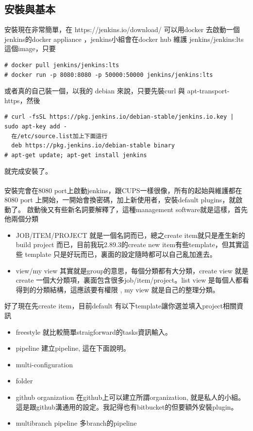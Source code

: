   \subsection{安裝與基本}
  安裝現在非常簡單，在 https://jenkins.io/download/
  可以用docker 去啟動一個jenkins的docker appliance ，jenkins小組會在docker hub 
  維護 jenkins/jenkins:lts 這個image，只要
  \begin{verbatim}
# docker pull jenkins/jenkins:lts
# docker run -p 8080:8080 -p 50000:50000 jenkins/jenkins:lts
  \end{verbatim}
  或者真的自己裝一個，以我的 debian 來說，只要先裝curl 與 apt-transport-https，然後
  \begin{verbatim}
# curl -fsSL https://pkg.jenkins.io/debian-stable/jenkins.io.key | sudo apt-key add -
  在/etc/source.list加上下面這行
  deb https://pkg.jenkins.io/debian-stable binary
# apt-get update; apt-get install jenkins
  \end{verbatim}
  就完成安裝了。
  \\\\
  安裝完會在8080 port上啟動jenkins，跟CUPS一樣很像，所有的起始與維護都在8080 port
  上開始，一開始會換密碼，加上新使用者，安裝default plugins，就啟動了。
  啟動後又有些新名詞要解釋了，這種management software就是這樣，首先他兩個分類
  \begin{itemize}
    \item JOB/ITEM/PROJECT 就是一個名詞而已，總之create item就只是產生新的build
      project 而已，目前我玩2.89.3的create new item有些template，但其實這些
      template 只是好玩而已，裏面的設定隨時都可以自己亂加進去。
    \item view/my view 其實就是group的意思，每個分類都有大分類，create view 就是
      create 一個大分類項，裏面包含很多job/item/project。list view 是每個人都看
      得到的分類結構，這應該要有權限 , my view 就是自己的整理分類。
  \end{itemize}
  好了現在先create item，目前default 有以下template讓你選並填入project相關資訊
  \begin{itemize}
    \item freestyle 就比較簡單straigforward的tasks資訊輸入。
    \item pipeline 建立pipeline, 這在下面說明。
    \item multi-configuration
    \item folder
    \item github organization 在github上可以建立所謂organization, 就是私人的小組。
      這是跟github溝通用的設定。我記得也有bitbucket的但要額外安裝plugin。
    \item multibranch pipeline 多branch的pipeline
  \end{itemize}
